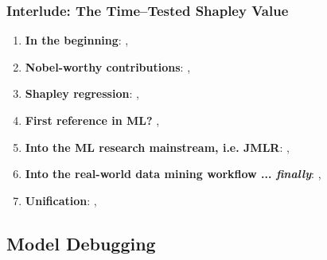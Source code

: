 \documentclass[11pt,
               aspectratio=169,
               hyperref={colorlinks}
               ]{beamer}
\begin{document}
			\begin{frame}
		
				\frametitle{Interlude: The Time--Tested Shapley Value}		
			
				\begin{enumerate}
				
					\item \textbf{In the beginning}: , 
					\item \textbf{Nobel-worthy contributions}: , 
					\item \textbf{Shapley regression}: , 
					\item \textbf{First reference in ML?} ,  	
					\item \textbf{Into the ML research mainstream, i.e. JMLR}: , 
					\item \textbf{Into the real-world data mining workflow ... \textit{finally}}: , 	
					\item \textbf{Unification}: , 	
				
				\end{enumerate}
			
			\end{frame}

		\subsection{Model Debugging}
\end{document}
